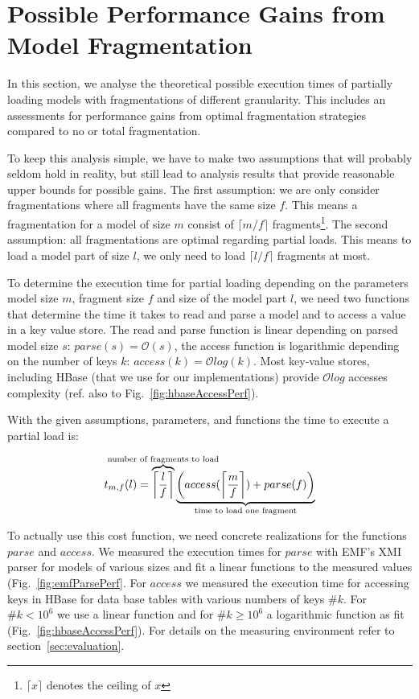 \section{Possible Performance Gains from Model Fragmentation}

In this section, we analyse the theoretical possible execution times of partially loading models with fragmentations of different granularity. This includes an assessments for performance gains from optimal fragmentation strategies compared to no or total fragmentation.

To keep this analysis simple, we have to make two assumptions that will probably seldom hold in reality, but still lead to analysis results that provide reasonable upper bounds for possible gains.
The first assumption: we are only consider fragmentations where all fragments have the same size $f$. 
This means a fragmentation for a model of size $m$ consist of $\lceil m/f \rceil$ fragments\footnote{$\lceil x\rceil$ denotes the ceiling of $x$}. 
The second assumption: all fragmentations are optimal regarding partial loads. This means to load a model part of size $l$, we only need to load $\lceil l/f\rceil$ fragments at most.

To determine the execution time for partial loading depending on the parameters model size $m$, fragment size $f$ and size of the model part $l$, we need two functions that determine the time it takes to read and parse a model and to access a value in a key value store. The read and parse function is linear depending on parsed model size $s$: $parse(s)=\mathcal{O}\left(s\right)$, the access function is logarithmic depending on the number of keys $k$: $access(k)=\mathcal{O}log(k)$. Most key-value stores, including HBase (that we use for our implementations) provide $\mathcal{O}log$ accesses complexity (ref. also to Fig.~\ref{fig:hbaseAccessPerf}).

With the given assumptions, parameters, and functions the time to execute a partial load is:

$$t_{m,f}(l)=\overbrace{\left\lceil\frac{l}{f}\right\rceil}^{\mathclap{\text{number of fragments to load}}}\underbrace{\left(access(\left\lceil\frac{m}{f}\right\rceil) + parse(f)\right)}_{\mathclap{\text{time to load one fragment}}}$$

To actually use this cost function, we need concrete realizations for the functions $parse$ and $access$. We measured the execution times for $parse$ with EMF's XMI parser for models of various sizes and fit a linear functions to the measured values (Fig.~\ref{fig:emfParsePerf}. For $access$ we measured the execution time for accessing keys in HBase for data base tables with various numbers of keys $\#k$. For $\#k<10^6$ we use a linear function and for $\#k\ge 10^6$ a logarithmic function as fit (Fig.~\ref{fig:hbaseAccessPerf}). For details on the measuring environment refer to section~\ref{sec:evaluation}.


